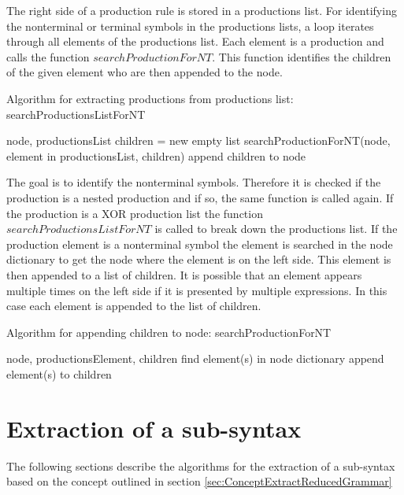 The right side of a production rule is stored in a productions list. For identifying the nonterminal or terminal symbols in the productions lists, a loop iterates through all elements of the productions list. Each element is a production and calls the function $searchProductionForNT$. This function identifies the children of the given element who are then appended to the node.

\begin{algorithm}[H]
\caption{Algorithm for extracting productions from productions list: searchProductionsListForNT}
\begin{algorithmic}[1] 
\Require node, productionsList
	\State children = new empty list
	\State searchProductionForNT(node, element in productionsList, children)
	\State append children to node
\EndFor
\end{algorithmic}
\end{algorithm}

The goal is to identify the nonterminal symbols. Therefore it is checked if the production is a nested production and if so, the same function is called again. If the production is a XOR production list the function $searchProductionsListForNT$ is called to break down the productions list. If the production element is a nonterminal symbol the element is searched in the node dictionary to get the node where the element is on the left side. This element is then appended to a list of children. It is possible that an element appears multiple times on the left side if it is presented by multiple expressions. In this case each element is appended to the list of children.

\begin{algorithm}[H]
\caption{Algorithm for appending children to node: searchProductionForNT}
\begin{algorithmic}[1] 
\Require node, productionsElement, children
		\State find element(s) in node dictionary
		\State append element(s) to children
	\EndIf
\EndFor
\end{algorithmic}
\end{algorithm}

\section{Extraction of a sub-syntax}\label{sec:ImplementationExtractReducedGrammar}
The following sections describe the algorithms for the extraction of a sub-syntax based on the concept outlined in section \ref{sec:ConceptExtractReducedGrammar}
